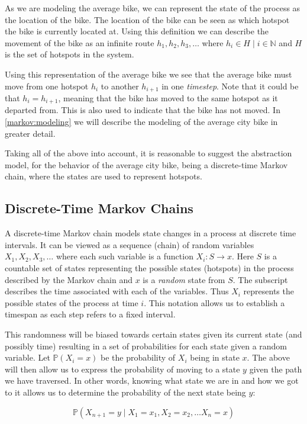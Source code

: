 As we are modeling the average bike, we can represent the state of the process as the location of the bike.
The location of the bike can be seen as which hotspot the bike is currently located at.
Using this definition we can describe the movement of the bike as an infinite route $h_1, h_2, h_3, \dots$ where $h_i \in H \mid i \in \mathbb{N}$ and $H$ is the set of hotspots in the system.

Using this representation of the average bike we see that the average bike must move from one hotspot $h_i$ to another $h_{i+1}$ in one \textit{timestep}.
Note that it could be that $h_i = h_{i+1}$, meaning that the bike has moved to the same hotspot as it departed from.
This is also used to indicate that the bike has not moved.
In \cref{markov:modeling} we will describe the modeling of the average city bike in greater detail.

Taking all of the above into account, it is reasonable to suggest the abstraction model, for the behavior of the average city bike, being a discrete-time Markov chain, where the states are used to represent hotspots.

\subsection{Discrete-Time Markov Chains}\label{markov}
A discrete-time Markov chain models state changes in a process at discrete time intervals.
It can be viewed as a sequence (chain) of random variables $X_1, X_2, X_3, \dots$ where each such variable is a function $X_i:S \rightarrow x$.
Here $S$ is a countable set of states representing the possible states (hotspots) in the process described by the Markov chain and $x$ is a \textit{random} state from $S$.
The subscript describes the time associated with each of the variables.
Thus $X_i$ represents the possible states of the process at time $i$.
This notation allows us to establish a timespan as each step refers to a fixed interval.

This randomness will be biased towards certain states given its current state (and possibly time) resulting in a set of probabilities for each state given a random variable.
Let $\mathbb{P}(X_i = x)$ be the probability of $X_i$ being in state $x$.
The above will then allow us to express the probability of moving to a state $y$ given the path we have traversed.
In other words, knowing what state we are in and how we got to it allows us to determine the probability of the next state being $y$:

$$\mathbb{P}(X_{n+1} = y \mid X_1 = x_1, X_2 = x_2, \dots X_n = x)$$

